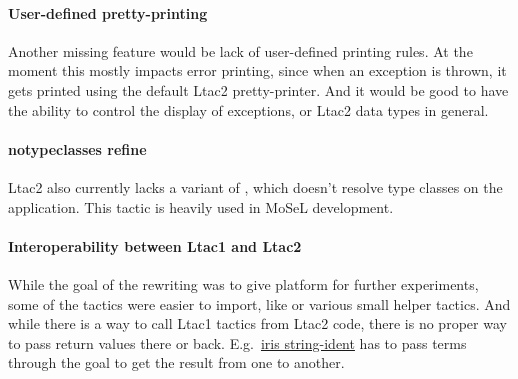 \paragraph{User-defined pretty-printing}
Another missing feature would be lack of user-defined printing rules.
At the moment this mostly impacts error printing, since when an exception is thrown, it gets printed using the default Ltac2 pretty-printer.
And it would be good to have the ability to control the display of exceptions, or Ltac2 data types in general.

\paragraph{notypeclasses refine}

Ltac2 also currently lacks a variant of , which doesn't resolve type classes on the application.
This tactic is heavily used in MoSeL development.

\paragraph{Interoperability between Ltac1 and Ltac2}

While the goal of the rewriting was to give platform for further experiments, some of the tactics were easier to import, like  or various small helper tactics.
And while there is a way to call Ltac1 tactics from Ltac2 code, there is no proper way to pass return values there or back.
E.g.\ \href{https://gitlab.mpi-sws.org/iris/string-ident/}{iris string-ident} has to pass terms through the goal to get the result from one to another.

